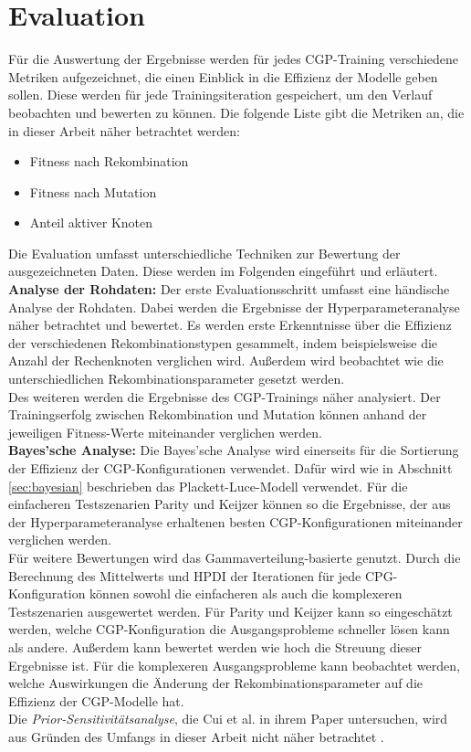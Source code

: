 \section{Evaluation}
\label{sec:Evaluation}

Für die Auswertung der Ergebnisse werden für jedes CGP-Training verschiedene Metriken aufgezeichnet, die einen Einblick in die Effizienz der Modelle geben sollen.
Diese werden für jede Trainingsiteration gespeichert, um den Verlauf beobachten und bewerten zu können.
Die folgende Liste gibt die Metriken an, die in dieser Arbeit näher betrachtet werden:
\begin{itemize}
	\item Fitness nach Rekombination
	\item Fitness nach Mutation
	\item Anteil aktiver Knoten
\end{itemize}

Die Evaluation umfasst unterschiedliche Techniken zur Bewertung der ausgezeichneten Daten.
Diese werden im Folgenden eingeführt und erläutert.\\

\textbf{Analyse der Rohdaten:} Der erste Evaluationsschritt umfasst eine händische Analyse der Rohdaten.
Dabei werden die Ergebnisse der Hyperparameteranalyse näher betrachtet und bewertet.
Es werden erste Erkenntnisse über die Effizienz der verschiedenen Rekombinationstypen gesammelt, indem beispielsweise die Anzahl der Rechenknoten verglichen wird.
Außerdem wird beobachtet wie die unterschiedlichen Rekombinationsparameter gesetzt werden.\\
Des weiteren werden die Ergebnisse des CGP-Trainings näher analysiert.
Der Trainingserfolg zwischen Rekombination und Mutation können anhand der jeweiligen Fitness-Werte miteinander verglichen werden.\\

\textbf{Bayes'sche Analyse:} Die Bayes'sche Analyse wird einerseits für die Sortierung der Effizienz der CGP-Konfigurationen verwendet. 
Dafür wird wie in Abschnitt \ref{sec:bayesian} beschrieben das Plackett-Luce-Modell verwendet.
Für die einfacheren Testszenarien Parity und Keijzer können so die Ergebnisse, der aus der Hyperparameteranalyse erhaltenen besten CGP-Konfigurationen miteinander verglichen werden.\\
Für weitere Bewertungen wird das Gammaverteilung-basierte genutzt.
Durch die Berechnung des Mittelwerts und HPDI der Iterationen für jede CPG-Konfiguration können sowohl die einfacheren als auch die komplexeren Testszenarien ausgewertet werden.
Für Parity und Keijzer kann so eingeschätzt werden, welche CGP-Konfiguration die Ausgangsprobleme schneller lösen kann als andere.
Außerdem kann bewertet werden wie hoch die Streuung dieser Ergebnisse ist.
Für die komplexeren Ausgangsprobleme kann beobachtet werden, welche Auswirkungen die Änderung der Rekombinationsparameter auf die Effizienz der CGP-Modelle hat.\\
Die \emph{Prior-Sensitivitätsanalyse}, die Cui et al. in ihrem Paper untersuchen, wird aus Gründen des Umfangs in dieser Arbeit nicht näher betrachtet \cite{cui_equidistant_2023}.\\

